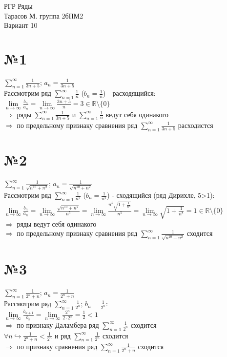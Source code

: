 \documentclass[a4paper,12pt]{article}
\begin{document}
\begin{flushleft}
	\Large{РГР Ряды\\ Тарасов М. группа 2бПМ2\\ Вариант 10}
\end{flushleft}
	
\section*{№1}
	$\sum\limits_{n=1}^{\infty} \frac{1}{3n+5}$; $a_n = \frac{1}{3n+5}$\\
	Рассмотрим ряд $\sum\limits_{n=1}^{\infty} \frac{1}{n}$ ($b_n = \frac{1}{n}$) - расходящийся:\\
	$\lim\limits_{n\to\infty} \frac{b_n}{a_n} = \lim\limits_{n\to\infty} \frac{3n+5}{n} = 3 \in \mathbb{R} \setminus \{0\}$\\
	$\Rightarrow$ ряды $\sum\limits_{n=1}^{\infty} \frac{1}{3n+5}$ и $\sum\limits_{n=1}^{\infty} \frac{1}{n}$ ведут себя одинакого\\
	$\Rightarrow$ по предельному признаку сравнения ряд $\sum\limits_{n=1}^{\infty} \frac{1}{3n+5}$ расходистся
	
\section*{№2}
	$\sum\limits_{n=1}^{\infty} \frac{1}{\sqrt{n^{10}+n^2}}$; 
	$a_n = \frac{1}{\sqrt{n^{10}+n^2}}$\\
	Рассмотрим ряд 
	$\sum\limits_{n=1}^{\infty} \frac{1}{n^5}$ ($b_n=\frac{1}{n^5}$)
	- сходящийся (ряд Дирихле, 5>1):\\
	$
	\lim\limits_{n\to\infty} \frac{b_n}{a_n} = 
	\lim\limits_{n\to\infty} \frac{\sqrt{n^{10}+n^2}}{n^5} = 
	\lim\limits_{n\to\infty} \frac{n^5\sqrt{1+\frac{1}{n^8}}}{n^5} = 
	\lim\limits_{n\to\infty} \sqrt{1+\frac{1}{n^8}} = 1\in \mathbb{R} \setminus \{0\}$\\
	$\Rightarrow$ ряды ведут себя одинакого\\
	$\Rightarrow$ по предельному признаку сравнения ряд $\sum\limits_{n=1}^{\infty} \frac{1}{\sqrt{n^{10}+n^2}}$ сходится
	
\section*{№3}
	$\sum\limits_{n=1}^{\infty} \frac{1}{2^n+n}$; 
	$a_n = \frac{1}{2^n+n}$\\
	Рассмотрим ряд $\sum\limits_{n=1}^{\infty} \frac{1}{2^n}$;
	$b_n = \frac{1}{2^n}$:\\
	$
	\lim\limits_{n\to\infty} \frac{b_{n+1}}{b_n} =
	\lim\limits_{n\to\infty} \frac{2^n}{2\cdot2^n} = \frac{1}{2} < 1
	$\\
	$\Rightarrow$ по признаку Даламбера ряд $\sum\limits_{n=1}^{\infty} \frac{1}{2^n}$ сходится\\	
	$\forall n  \hookrightarrow \frac{1}{2^n+n} < \frac{1}{2^n}$
	и ряд $\sum\limits_{n=1}^{\infty} \frac{1}{2^n}$ сходится\\
	$\Rightarrow$ по признаку сравнения ряд $\sum\limits_{n=1}^{\infty} \frac{1}{2^n+n}$
	сходится
\end{document}
